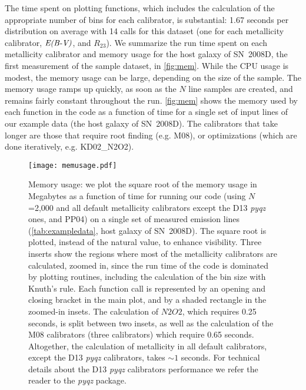 \documentclass{emulateapj}
\newcommand{\ebmv}{\ensuremath{\mathrm{\emph{E(B-V)}}}}
\begin{document}
The time spent on plotting functions, which includes the calculation
of the appropriate number of bins for each calibrator, is substantial:
1.67 seconds per distribution on average with 14 calls for this
dataset (one for each metallicity calibrator, \ebmv, and $R_{23}$).
We summarize the run time spent on each metallicity calibrator and
memory usage for the host galaxy of SN~2008D, the first measurement of
the sample dataset, in \autoref{fig:mem}. While the CPU usage is
modest, the memory usage can be large, depending on the size of the
sample.  The memory usage ramps up quickly, as soon as the $N$ line
samples are created, and remains fairly constant throughout the run.
\autoref{fig:mem} shows the memory used by each function in the code
as a function of time for a single set of input lines of our example
data (the host galaxy of SN~2008D). The calibrators that take longer
are those that require root finding (e.g. M08), or optimizations
(which are done iteratively, e.g. KD02\_N2O2).

\begin{figure}[ht!]
  \texttt{[image: memusage.pdf]}
   \caption{Memory usage: we plot the square root of the memory usage
     in Megabytes as a function of time for running our code (using
     $N$=2,000 and all default metallicity calibrators except the D13
     \emph{pyqz} ones, and PP04) on a single set of measured emission
     lines (\autoref{tab:exampledata}, host galaxy of SN~2008D). The
     square root is plotted, instead of the natural value, to enhance
     visibility.  Three inserts show the regions where most of the
     metallicity calibrators are calculated, zoomed in, since the run
     time of the code is dominated by plotting routines, including the
     calculation of the bin size with Knuth's rule.  Each function
     call is represented by an opening and closing bracket in the main
     plot, and by a shaded rectangle in the zoomed-in insets.  The
     calculation of $N2O2$, which requires 0.25 seconds, is split
     between two insets, as well as the calculation of the M08
     calibrators (three calibrators) which require 0.65
     seconds. Altogether, the calculation of metallicity in all
     default calibrators, except the D13 \emph{pyqz} calibrators,
     takes $\sim1$ seconds. For technical details about the D13
     \emph{pyqz} calibrators performance we refer the reader to the
     \emph{pyqz} package.}
 \label{fig:mem}
\end{figure}
\end{document}
